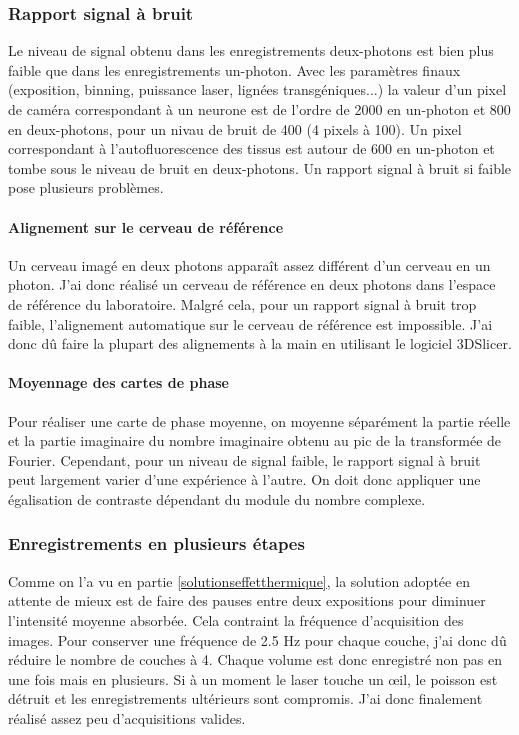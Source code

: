 \subsubsection{Rapport signal à bruit}

Le niveau de signal obtenu dans les enregistrements deux-photons est bien plus faible que dans les enregistrements un-photon. Avec les paramètres finaux (exposition, binning, puissance laser, lignées transgéniques...) la valeur d'un pixel de caméra correspondant à un neurone est de l'ordre de 2000 en un-photon et 800 en deux-photons, pour un nivau de bruit de 400 (4 pixels à 100). Un pixel correspondant à l'autofluorescence des tissus est autour de 600 en un-photon et tombe sous le niveau de bruit en deux-photons. Un rapport signal à bruit si faible pose plusieurs problèmes.
\paragraph{Alignement sur le cerveau de référence}
Un cerveau imagé en deux photons apparaît assez différent d'un cerveau en un photon. J'ai donc réalisé un cerveau de référence en deux photons dans l'espace de référence du laboratoire. Malgré cela, pour un rapport signal à bruit trop faible, l'alignement automatique sur le cerveau de référence est impossible. J'ai donc dû faire la plupart des alignements à la main en utilisant le logiciel 3DSlicer.
\paragraph{Moyennage des cartes de phase}
Pour réaliser une carte de phase moyenne, on moyenne séparément la partie réelle et la partie imaginaire du nombre imaginaire obtenu au pic de la transformée de Fourier. Cependant, pour un niveau de signal faible, le rapport signal à bruit peut largement varier d'une expérience à l'autre. On doit donc appliquer une égalisation de contraste dépendant du module du nombre complexe.

\subsubsection{Enregistrements en plusieurs étapes}
Comme on l'a vu en partie \ref{solutionseffetthermique}, la solution adoptée en attente de mieux est de faire des pauses entre deux expositions pour diminuer l'intensité moyenne absorbée. Cela contraint la fréquence d'acquisition des images. Pour conserver une fréquence de 2.5 Hz pour chaque couche, j'ai donc dû réduire le nombre de couches à 4. Chaque volume est donc enregistré non pas en une fois mais en plusieurs. Si à un moment le laser touche un œil, le poisson est détruit et les enregistrements ultérieurs sont compromis. J'ai donc finalement réalisé assez peu d'acquisitions valides.

